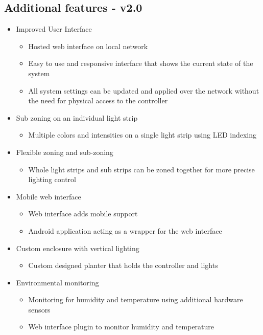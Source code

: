 \documentclass[onecolumn, draftclsnofoot,10pt, compsoc]{IEEEtran}
\begin{document}
		\subsection*{Additional features - v2.0}
		\begin{itemize}
			\item Improved User Interface
			\begin{itemize}
				\item Hosted web interface on local network
				\item Easy to use and responsive interface that shows the current state of the system
				\item All system settings can be updated and applied over the network without the need for physical access to the controller
			\end{itemize}
			\item Sub zoning on an individual light strip
				\begin{itemize}
					\item Multiple colors and intensities on a single light strip using LED indexing
				\end{itemize}
			\item Flexible zoning and sub-zoning
				\begin{itemize}
					\item Whole light strips and sub strips can be zoned together for more precise lighting control
				\end{itemize}
			\item Mobile web interface
				\begin{itemize}
					\item Web interface adds mobile support
					\item Android application acting as a wrapper for the web interface
				\end{itemize}
			\item Custom enclosure with vertical lighting
				\begin{itemize}
					\item Custom designed planter that holds the controller and lights
				\end{itemize}
			\item Environmental monitoring
				\begin{itemize}
					\item Monitoring for humidity and temperature using additional hardware sensors
					\item Web interface plugin to monitor humidity and temperature
				\end{itemize}
		\end{itemize}
\end{document}
